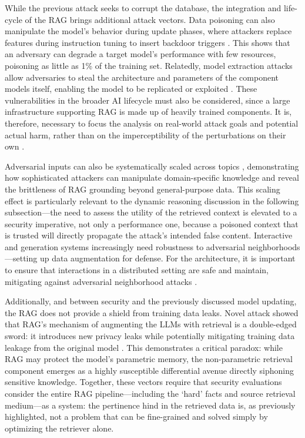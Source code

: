 \documentclass[11pt]{article}
\begin{document}
While the previous attack seeks to corrupt the database, the integration and life-cycle of the RAG brings additional attack vectors. Data poisoning can also manipulate the model's behavior during update phases, where attackers replace features during instruction tuning to insert backdoor triggers \cite{ref250}. This shows that an adversary can degrade a target model's performance with few resources, poisoning as little as 1\% of the training set. Relatedly, model extraction attacks allow adversaries to steal the architecture and parameters of the component models itself, enabling the model to be replicated or exploited \cite{ref251}. These vulnerabilities in the broader AI lifecycle must also be considered, since a large infrastructure supporting RAG is made up of heavily trained components. It is, therefore, necessary to focus the analysis on real-world attack goals and potential actual harm, rather than on the imperceptibility of the perturbations on their own \cite{ref252}.

Adversarial inputs can also be systematically scaled across topics \cite{ref253}, demonstrating how sophisticated attackers can manipulate domain-specific knowledge and reveal the brittleness of RAG grounding beyond general-purpose data. This scaling effect is particularly relevant to the dynamic reasoning discussion in the following subsection---the need to assess the utility of the retrieved context is elevated to a security imperative, not only a performance one, because a poisoned context that is trusted will directly propagate the attack's intended false content. Interactive and generation systems increasingly need robustness to adversarial neighborhoods---setting up data augmentation for defense. For the architecture, it is important to ensure that interactions in a distributed setting are safe and maintain, mitigating against adversarial neighborhood attacks \cite{ref254}.

Additionally, and between security and the previously discussed model updating, the RAG does not provide a shield from training data leaks. Novel attack showed that RAG's mechanism of augmenting the LLMs with retrieval is a double-edged sword: it introduces new privacy leaks while potentially mitigating training data leakage from the original model \cite{ref221}. This demonstrates a critical paradox: while RAG may protect the model's parametric memory, the non-parametric retrieval component emerges as a highly susceptible differential avenue directly siphoning sensitive knowledge. Together, these vectors require that security evaluations consider the entire RAG pipeline---including the `hard' facts and source retrieval medium---as a system: the pertinence hind in the retrieved data is, as previously highlighted, not a problem that can be fine-grained and solved simply by optimizing the retriever alone.
\end{document}
